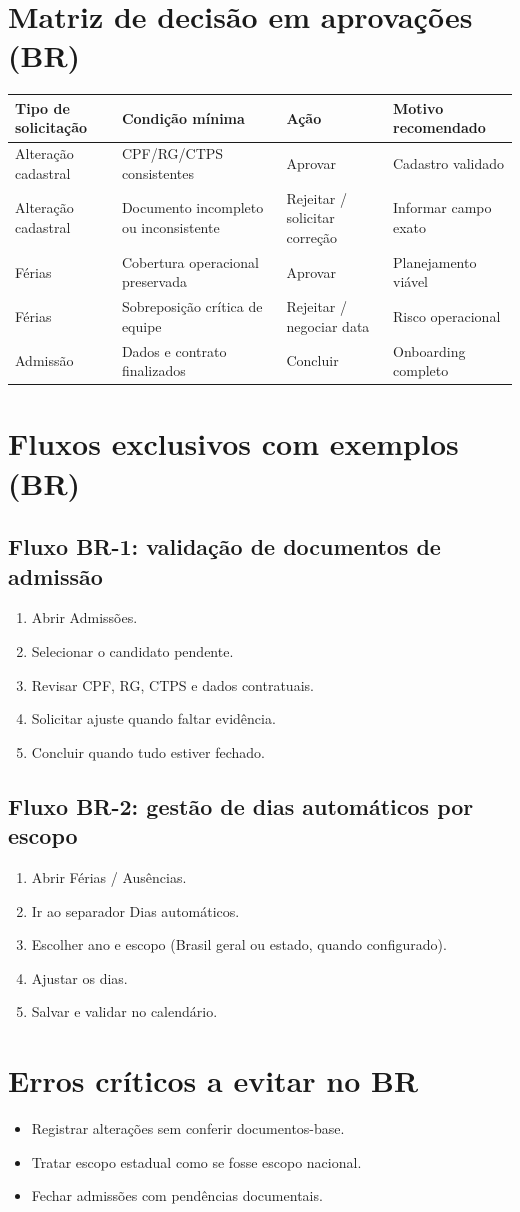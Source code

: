 \section{Matriz de decisão em aprovações (BR)}
\begin{longtable}{|p{}|p{}|p{}|p{}|}
\hline
\textbf{Tipo de solicitação} & \textbf{Condição mínima} & \textbf{Ação} & \textbf{Motivo recomendado} \\
\hline
Alteração cadastral & CPF/RG/CTPS consistentes & Aprovar & Cadastro validado \\
\hline
Alteração cadastral & Documento incompleto ou inconsistente & Rejeitar / solicitar correção & Informar campo exato \\
\hline
Férias & Cobertura operacional preservada & Aprovar & Planejamento viável \\
\hline
Férias & Sobreposição crítica de equipe & Rejeitar / negociar data & Risco operacional \\
\hline
Admissão & Dados e contrato finalizados & Concluir & Onboarding completo \\
\hline
\end{longtable}

\section{Fluxos exclusivos com exemplos (BR)}
\subsection{Fluxo BR-1: validação de documentos de admissão}
\begin{enumerate}
  \item Abrir Admissões.
  \item Selecionar o candidato pendente.
  \item Revisar CPF, RG, CTPS e dados contratuais.
  \item Solicitar ajuste quando faltar evidência.
  \item Concluir quando tudo estiver fechado.
\end{enumerate}

\subsection{Fluxo BR-2: gestão de dias automáticos por escopo}
\begin{enumerate}
  \item Abrir Férias / Ausências.
  \item Ir ao separador Dias automáticos.
  \item Escolher ano e escopo (Brasil geral ou estado, quando configurado).
  \item Ajustar os dias.
  \item Salvar e validar no calendário.
\end{enumerate}

\section{Erros críticos a evitar no BR}
\begin{itemize}
  \item Registrar alterações sem conferir documentos-base.
  \item Tratar escopo estadual como se fosse escopo nacional.
  \item Fechar admissões com pendências documentais.
\end{itemize}
